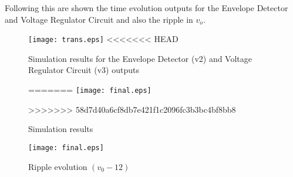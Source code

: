 Following this are shown the time evolution outputs for the Envelope Detector and Voltage Regulator Circuit and also the ripple in $v_o$. 

\begin{figure}[H]
        \centering
        \texttt{[image: trans.eps]}
<<<<<<< HEAD
        \caption{Simulation results for the Envelope Detector (v2) and Voltage Regulator Circuit (v3) outputs}
=======
        \vspace{1cm}
        \texttt{[image: final.eps]}        
        \caption{Simulation results}
>>>>>>> 58d7d40a6cf8db7e421f1c2096fc3b3bc4bf8bb8
        \label{sim_res}
\end{figure}

\begin{figure}[H]
        \centering
        \texttt{[image: final.eps]}
        \caption{Ripple evolution $(v_0-12)$}
        \label{sim_ripple_res}
\end{figure}
